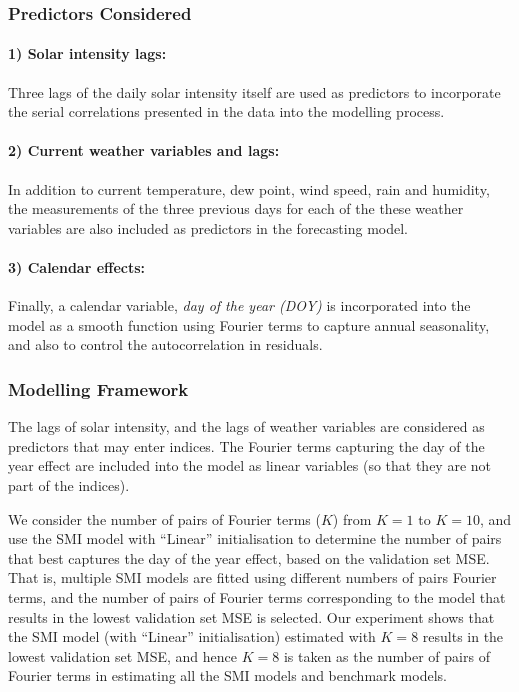 \documentclass[
  11pt,
  a4paper,
]{report}
\begin{document}
\subsubsection{Predictors Considered}\label{predictors-considered-1}

\paragraph{1) Solar intensity lags:}\label{solar-intensity-lags}

Three lags of the daily solar intensity itself are used as predictors to
incorporate the serial correlations presented in the data into the
modelling process.

\paragraph{2) Current weather variables and
lags:}\label{current-weather-variables-and-lags}

In addition to current temperature, dew point, wind speed, rain and
humidity, the measurements of the three previous days for each of the
these weather variables are also included as predictors in the
forecasting model.

\paragraph{3) Calendar effects:}\label{calendar-effects-1}

Finally, a calendar variable, \emph{day of the year (DOY)} is
incorporated into the model as a smooth function using Fourier terms to
capture annual seasonality, and also to control the autocorrelation in
residuals.

\subsubsection{Modelling Framework}\label{modelling-framework-1}

The lags of solar intensity, and the lags of weather variables are
considered as predictors that may enter indices. The Fourier terms
capturing the day of the year effect are included into the model as
linear variables (so that they are not part of the indices).

We consider the number of pairs of Fourier terms (\(K\)) from \(K = 1\)
to \(K = 10\), and use the SMI model with ``Linear'' initialisation to
determine the number of pairs that best captures the day of the year
effect, based on the validation set MSE. That is, multiple SMI models
are fitted using different numbers of pairs Fourier terms, and the
number of pairs of Fourier terms corresponding to the model that results
in the lowest validation set MSE is selected. Our experiment shows that
the SMI model (with ``Linear'' initialisation) estimated with \(K = 8\)
results in the lowest validation set MSE, and hence \(K = 8\) is taken
as the number of pairs of Fourier terms in estimating all the SMI models
and benchmark models.
\end{document}
